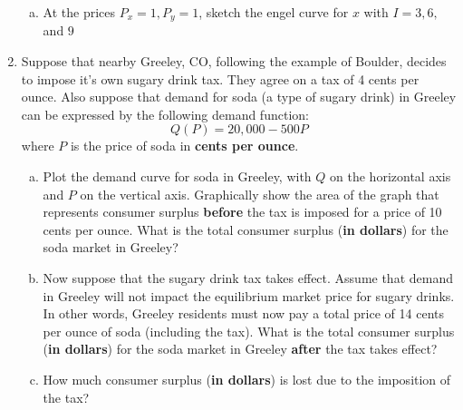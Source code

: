 \documentclass[11pt]{article}
\begin{document}
\begin{enumerate}
\begin{enumerate}[(a)]


    \item At the prices $P_x = 1, P_y = 1$, sketch the engel curve for $x$ with $I = 3, 6,$ and $9$
    
  \end{enumerate}
  
  \newpage 
  \item Suppose that nearby Greeley, CO, following the example of Boulder, decides to impose it's own sugary drink tax. They agree on a tax of 4 cents per ounce. Also suppose that demand for soda (a type of sugary drink) in Greeley can be expressed by the following demand function:
  $$
    Q(P) = 20,000 - 500P
  $$
  where $P$ is the price of soda in \textbf{cents per ounce}.

  \begin{enumerate}[(a)]
    \item Plot the demand curve for soda in Greeley, with $Q$ on the horizontal axis and $P$ on the vertical axis. Graphically show the area of the graph that represents consumer surplus \textbf{before} the tax is imposed for a price of 10 cents per ounce. What is the total consumer surplus (\textbf{in dollars}) for the soda market in Greeley?
    
    \vspace*{70mm}
    \item Now suppose that the sugary drink tax takes effect. Assume that demand in Greeley will not impact the equilibrium market price for sugary drinks. In other words, Greeley residents must now pay a total price of 14 cents per ounce of soda (including the tax). What is the total consumer surplus (\textbf{in dollars}) for the soda market in Greeley \textbf{after} the tax takes effect?
    
    \vspace*{50mm}
    \item How much consumer surplus (\textbf{in dollars}) is lost due to the imposition of the tax?
  \end{enumerate}
  \newpage
\end{enumerate}
\end{document}
